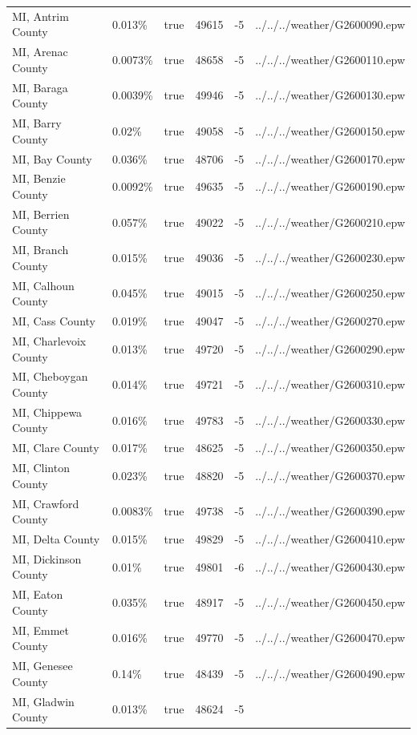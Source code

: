 \begin{longtable}[]{@{}llllll@{}}
MI, Antrim County & 0.013\% & true & 49615 & -5 &
../../../weather/G2600090.epw \\
MI, Arenac County & 0.0073\% & true & 48658 & -5 &
../../../weather/G2600110.epw \\
MI, Baraga County & 0.0039\% & true & 49946 & -5 &
../../../weather/G2600130.epw \\
MI, Barry County & 0.02\% & true & 49058 & -5 &
../../../weather/G2600150.epw \\
MI, Bay County & 0.036\% & true & 48706 & -5 &
../../../weather/G2600170.epw \\
MI, Benzie County & 0.0092\% & true & 49635 & -5 &
../../../weather/G2600190.epw \\
MI, Berrien County & 0.057\% & true & 49022 & -5 &
../../../weather/G2600210.epw \\
MI, Branch County & 0.015\% & true & 49036 & -5 &
../../../weather/G2600230.epw \\
MI, Calhoun County & 0.045\% & true & 49015 & -5 &
../../../weather/G2600250.epw \\
MI, Cass County & 0.019\% & true & 49047 & -5 &
../../../weather/G2600270.epw \\
MI, Charlevoix County & 0.013\% & true & 49720 & -5 &
../../../weather/G2600290.epw \\
MI, Cheboygan County & 0.014\% & true & 49721 & -5 &
../../../weather/G2600310.epw \\
MI, Chippewa County & 0.016\% & true & 49783 & -5 &
../../../weather/G2600330.epw \\
MI, Clare County & 0.017\% & true & 48625 & -5 &
../../../weather/G2600350.epw \\
MI, Clinton County & 0.023\% & true & 48820 & -5 &
../../../weather/G2600370.epw \\
MI, Crawford County & 0.0083\% & true & 49738 & -5 &
../../../weather/G2600390.epw \\
MI, Delta County & 0.015\% & true & 49829 & -5 &
../../../weather/G2600410.epw \\
MI, Dickinson County & 0.01\% & true & 49801 & -6 &
../../../weather/G2600430.epw \\
MI, Eaton County & 0.035\% & true & 48917 & -5 &
../../../weather/G2600450.epw \\
MI, Emmet County & 0.016\% & true & 49770 & -5 &
../../../weather/G2600470.epw \\
MI, Genesee County & 0.14\% & true & 48439 & -5 &
../../../weather/G2600490.epw \\
MI, Gladwin County & 0.013\% & true & 48624 & -5 &

\end{longtable}
